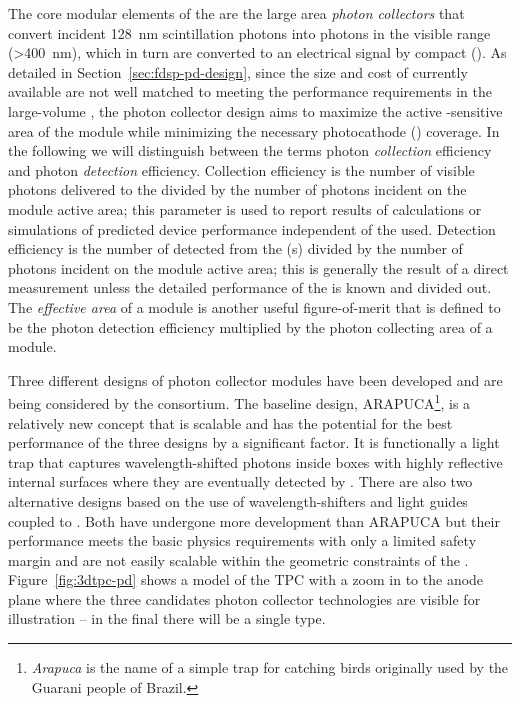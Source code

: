 The core modular elements of the  are the large area \textit{photon collectors} that convert incident \SI{128}{nm} scintillation photons into photons in the visible range (>\SI{400}{nm}), which in turn are converted to an electrical signal by compact (). 
As detailed in Section~\ref{sec:fdsp-pd-design}, since the size and cost of currently available  are not well matched to meeting the performance requirements in the large-volume  , the photon collector design aims to maximize the active -sensitive area of the  module while minimizing the necessary photocathode () coverage. 
In the following we will distinguish between the terms photon \textit{collection} efficiency and photon \textit{detection} efficiency. Collection efficiency is the number of visible photons delivered to the  divided by the number of  photons incident on the  module active area; this parameter is used to report results of calculations or simulations of predicted device performance independent of the  used.  Detection efficiency is the number of detected \phel from the (s) divided by the number of  photons incident on the  module active area; this is generally the result of a direct measurement unless the detailed performance of the  is known and divided out. The \textit{effective area} of a  module is another useful figure-of-merit that is defined to be the photon detection efficiency multiplied by the photon collecting area of a  module. 

Three different designs of  photon collector modules have been developed and are being considered by the \single {} consortium. The baseline design, ARAPUCA\footnote{\textit{Arapuca} is the name of a simple trap for catching birds originally used by the Guarani people of Brazil.}, is a relatively new concept that is scalable and has the potential for the best performance of the three designs by a significant factor. It is functionally a light trap that captures wavelength-shifted photons inside boxes with highly reflective internal surfaces where they are eventually detected by .  There are also two alternative designs based on the use of wavelength-shifters and light guides coupled to . Both have undergone more development than ARAPUCA but their performance meets the basic physics requirements with only a limited safety margin and are not easily scalable within the geometric constraints of the .
Figure~\ref{fig:3dtpc-pd} shows a \threed model of the \single TPC with a zoom in to the anode plane where the three candidates photon collector technologies are visible for illustration -- in the final  there will be a single type.

